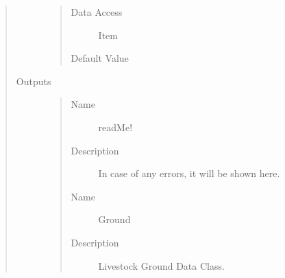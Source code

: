 \documentclass[letterpaper,10pt,english]{sphinxmanual}
\begin{document}
\begin{quote}
\begin{description}
\begin{quote}
\begin{description}
\item[{Data Access}] \leavevmode
Item

\item[{Default Value}] \leavevmode
{}

\end{description}\end{quote}

\item[{Outputs}] \leavevmode\begin{quote}\begin{description}
\item[{Name}] \leavevmode
readMe!

\item[{Description}] \leavevmode
In case of any errors, it will be shown here.

\item[{Name}] \leavevmode
Ground

\item[{Description}] \leavevmode
Livestock Ground Data Class.

\end{description}\end{quote}

\end{description}\end{quote}
\end{document}
